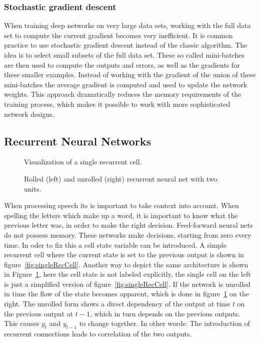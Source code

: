 \subsubsection{Stochastic gradient descent}
When training deep  networks on very large data sets, working with the full data set to compute the current gradient becomes very inefficient. It is common practice to use stochastic gradient descent instead of the classic algorithm. The idea is to select small subsets of the full data set. These so called mini-batches are then used to compute the outputs and errors, as well as the gradients for these smaller examples. Instead of working with the gradient of the union of these mini-batches the average gradient is computed and used to update the network weights. This approach dramatically reduces the memory requirements of the training process, which makes it possible to work with more sophisticated network designs.

\subsection{Recurrent Neural Networks}
\begin{figure}
\centering

\caption{Visualization of a single recurrent cell.}
\label{fig:singleRecCell}

\caption{Rolled (left) and unrolled (right) recurrent neural net with two units.}
\label{fig:unrolledNet}
\end{figure}
When processing speech its is important to take context into account. When spelling the letters which make up a word, it is important to know what the previous letter was, in order to make the right decision.
Feed-forward neural nets do not possess memory. These networks make decisions, starting from zero every time. In oder to fix this a cell state variable can be introduced. A simple recurrent cell where the current state is set to the previous output is shown in figure~\ref{fig:singleRecCell}. Another way to depict the same architecture is shown in Figure~\ref{fig:unrolledNet}, here the cell state is not labeled explicitly, the single cell on the left is just a simplified version of figure~\ref{fig:singleRecCell}. If the network is unrolled in time the flow of the state becomes apparent, which is done in figure~\ref{fig:unrolledNet} on the right.
The unrolled form shows a direct dependency of the output at time $t$ on the previous output at $t-1$, which in turn depends on the previous outputs. This causes $y_t$ and $y_{t-1}$ to change together. In other words: The introduction of recurrent connections leads to correlation of the two outputs.


